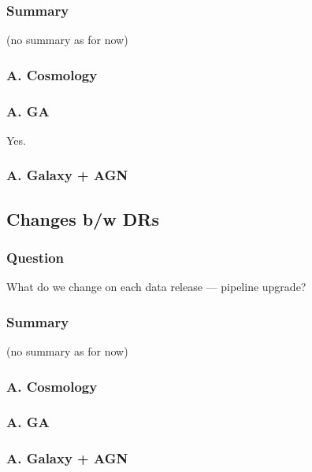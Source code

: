 \documentclass[a4paper,notitlepage]{article}
\begin{document}
\subsubsection{Summary}

(no summary as for now)

\subsubsection{A. Cosmology}

\subsubsection{A. GA}
Yes. 

\subsubsection{A. Galaxy + AGN}



\subsection{Changes b/w DRs}

\subsubsection{Question}
What do we change on each data release --- pipeline upgrade?

\subsubsection{Summary}

(no summary as for now)

\subsubsection{A. Cosmology}

\subsubsection{A. GA}

\subsubsection{A. Galaxy + AGN}
\end{document}
